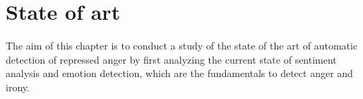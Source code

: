 \chapter{State of art}

The aim of this chapter is to conduct a study of the state of the art of automatic detection of repressed anger by first analyzing the current state of sentiment analysis and emotion detection, which are the fundamentals to detect anger and irony.




